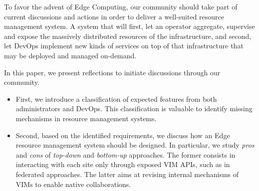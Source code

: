 To favor the advent of Edge Computing, our community should take part
of current discussions and actions in order to deliver a well-suited
resource management system. A system that will first, let an operator aggregate, supervise and expose the massively distributed resources of the infrastructure,
and second, let DevOps implement new kinds of services on top of that infrastructure that may be deployed and managed on-demand.


In this paper, we present reflections to initiate discussions through our community.

\begin{itemize}[noitemsep, topsep=0pt]
\item First, we introduce a classification of expected features from
  both administrators and DevOps. This classification is valuable to
  identify missing mechanisms in resource management systems.
\item Second, based on the identified requirements, we discuss
  how an Edge resource management system
  should be designed. In particular, we study \emph{pros} and
  \emph{cons} of \emph{top-down} and \emph{bottom-up} approaches. The
  former consists in interacting with each site only through
  exposed VIM APIs, such as in federated approaches. The
  latter aims at revising internal mechanisms of VIMs to enable native
  collaborations.
  \end{itemize}

